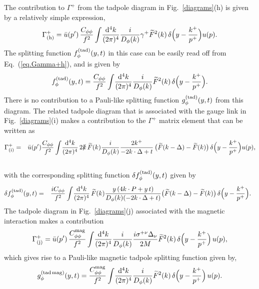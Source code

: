 \documentclass[preprintnumbers,prd,superscriptaddress,preprint]{revtex4-1}
\begin{document}
The contribution to $\Gamma^+$ from the tadpole diagram in Fig.~\ref{diagrams}(h) is given by a relatively simple expression,
%
\begin{equation} 
\Gamma_{\rm (h)}^+
= \bar{u}(p')\,
\frac{C_{\phi\phi}}{f^2}
\int\!\frac{\dd[4]{k}}{(2\pi)^4}
\frac{i}{D_\phi(k)}\gamma^+
\widetilde{F}^2(k)\,
\delta\Big(y-\frac{k^+}{p^+}\Big)u(p).
\label{eq.Gamma+h}
\end{equation}
%
The splitting function $f^{({\rm tad})}_\phi(y,t)$ in this case can be easily read off from Eq.~(\ref{eq.Gamma+h}), and is given by
%
\begin{equation} 
f^{({\rm tad})}_\phi(y,t)
= \frac{C_{\phi\phi}}{f^2}
\int\!\frac{\dd[4]{k}}{(2\pi)^4}
\frac{i}{D_\phi(k)}
\widetilde{F}^2(k)\,
\delta\Big(y-\frac{k^+}{p^+}\Big).
\end{equation}
%
There is no contribution to a Pauli-like splitting function $g^{({\rm tad})}_\phi(y,t)$ from this diagram.
%
The related tadpole diagram that is associated with the gauge link in Fig.~\ref{diagrams}(i) makes a contribution to the $\Gamma^+$ matrix element that can be written as 
%
\begin{eqnarray} 
\Gamma_{\rm (i)}^+
&=& \bar{u}(p')
\frac{C_{\phi\phi}}{f^2}
\int\!\frac{\dd[4]{k}}{(2\pi)^4}\,
2\slashed{k}\,
\widetilde{F}(k)
\frac{i}{D_\phi(k)}
\frac{2k^+}{-2k\cdot \Delta+t}\,
\big( \widetilde{F}(k-\Delta)-\widetilde{F}(k) \big)\,
\delta\Big( y-\frac{k^+}{p^+}\Big)
u(p),
\notag\\
&&
\end{eqnarray}
%
with the corresponding splitting function $\delta f^{({\rm tad})}_\phi(y,t)$ given by
%
\begin{eqnarray}
\delta f^{({\rm tad})}_\phi(y,t)
&=& \frac{iC_{\phi\phi}}{f^2}
\int\!\frac{\dd[4]{k}}{(2\pi)^4}\,
\widetilde{F}(k)
\frac{y\, (4k\cdot P + y\, t)}{D_\phi(k)(-2k\cdot \Delta + t)}
\big( \widetilde{F}(k-\Delta)-\widetilde{F}(k) \big)\,
\delta\Big( y-\frac{k^+}{p^+}\Big).~~
\end{eqnarray}
%
The tadpole diagram in Fig.~\ref{diagrams}(j) associated with the magnetic interaction makes a contribution
%
\begin{equation}
\Gamma_{\rm (j)}^+
= \bar{u}(p')\,
\frac{C^{{\rm mag}}_{\phi\phi}}{f^2}
\int\!\frac{\dd[4]{k}}{(2\pi)^4}\frac{i}{D_\phi(k)}
\frac{i\sigma^{+\nu}\Delta_\nu}{2M}
\widetilde{F}^2(k)\,
\delta\Big(y-\frac{k^+}{p^+}\Big)\,
u(p),
\end{equation}
%
which gives rise to a Pauli-like magnetic tadpole splitting function given by,
%
\begin{eqnarray} 
g^{({\rm tad\, mag})}_\phi(y,t)
= \frac{C^{{\rm mag}}_{\phi\phi}}{f^2}
\int\!\frac{\dd[4]{k}}{(2\pi)^4}
\frac{i}{D_\phi(k)}
\widetilde{F}^2(k)\,
\delta\Big(y-\frac{k^+}{p^+}\Big)\,
u(p).
\end{eqnarray}
\end{document}
